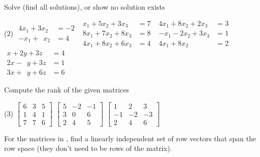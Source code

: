 \begin{exercise}
Solve (find all solutions), or show no solution exists
\begin{tasks}(2)
\task
$\begin{aligned}
 4x_1+3x_2 & = -2 \\
 -x_1+\phantom{3} x_2 & = 4
\end{aligned}$
\task
$\begin{aligned}
  x_1+5x_2+3x_3 & = 7 \\
 8x_1+7x_2+8x_3 & = 8 \\
 4x_1+8x_2+6x_3 & = 4
\end{aligned}$
\task
$\begin{aligned}
 4x_1+8x_2+2x_3 & = 3 \\
 -x_1-2x_2+3x_3 & = 1 \\
 4x_1+8x_2 \phantom{{}+3x_3} & = 2
\end{aligned}$
\task
$\begin{aligned}
  x+2y+3z & = 4 \\
2  x-\phantom{2} y+3z & = 1 \\
3  x+\phantom{2} y+6z & = 6
\end{aligned}$
\end{tasks}
\end{exercise}

\begin{exercise} \label{exercise:rankmatrix}
Compute the rank of the given matrices
\begin{tasks}(3)
\task
$\begin{bmatrix}
6 & 3 & 5 \\
1 & 4 & 1 \\
7 & 7 & 6
\end{bmatrix}$
\task
$\begin{bmatrix}
5 & -2 & -1 \\
3 & 0 & 6 \\
2 & 4 & 5
\end{bmatrix}$
\task
$\begin{bmatrix}
1 & 2 & 3 \\
-1 & -2 & -3 \\
2 & 4 & 6
\end{bmatrix}$
\end{tasks}
\end{exercise}

\begin{exercise}
For the matrices in , find
a linearly independent set of row vectors that span the row space
(they don't need to be rows of the matrix).
\end{exercise}
\exsol{%
}

